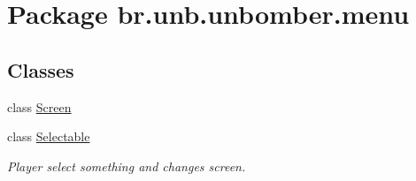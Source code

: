 \hypertarget{namespacebr_1_1unb_1_1unbomber_1_1menu}{\section{Package br.\+unb.\+unbomber.\+menu}
\label{namespacebr_1_1unb_1_1unbomber_1_1menu}
}
\subsection*{Classes}
\begin{DoxyCompactItemize}
\item 
class \hyperlink{classbr_1_1unb_1_1unbomber_1_1menu_1_1_screen}{Screen}
\item 
class \hyperlink{classbr_1_1unb_1_1unbomber_1_1menu_1_1_selectable}{Selectable}
\begin{DoxyCompactList}\small\item\em Player select something and changes screen. \end{DoxyCompactList}\end{DoxyCompactItemize}

